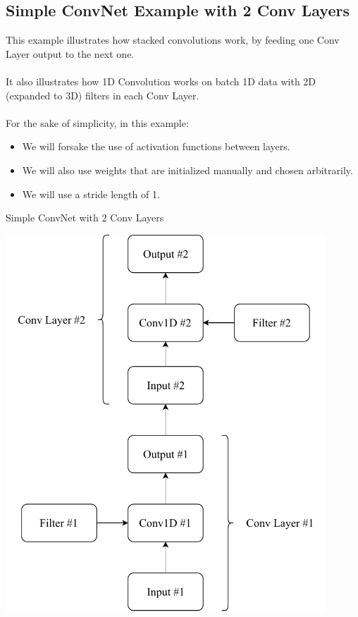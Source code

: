\documentclass[a4paper, 12pt]{report}
\begin{document}
\subsection{\textbf{Simple ConvNet Example with 2 Conv Layers}}
This example illustrates how stacked convolutions work, by feeding one Conv Layer output to the next one.\\\\
It also illustrates how 1D Convolution works on batch 1D data with 2D (expanded to 3D) filters in each Conv Layer.\\\\
For the sake of simplicity, in this example:
\begin{itemize}
	\item We will forsake the use of activation functions between layers.
	\item We will also use weights that are initialized manually and chosen arbitrarily.
	\item We will use a stride length of 1.
\end{itemize}
\begin{blockfigure}{Simple ConvNet with 2 Conv Layers}
	\begin{center}
		\includegraphics[width=0.9\textwidth]{convLayerExample}
	\end{center}
\end{blockfigure}
\end{document}
